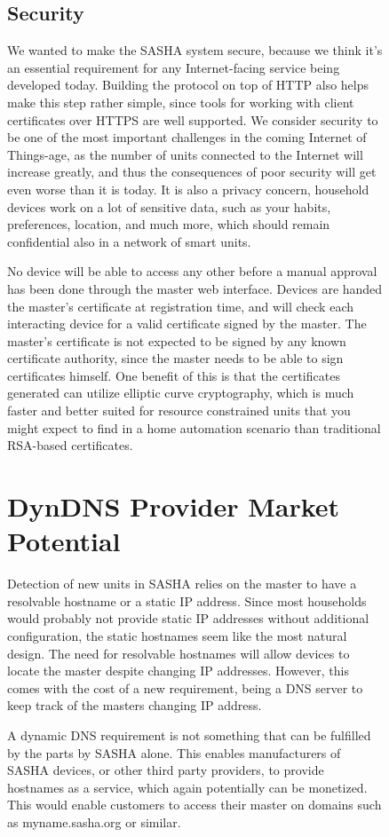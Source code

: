 \begin{figure}[H]
\subsection{Security}
We wanted to make the SASHA system secure, because we think it's an essential requirement for any Internet-facing service being developed today. Building the protocol on top of HTTP also helps make this step rather simple, since tools for working with client certificates over HTTPS are well supported. We consider security to be one of the most important challenges in the coming Internet of Things-age, as the number of units connected to the Internet will increase greatly, and thus the consequences of poor security will get even worse than it is today. It is also a privacy concern, household devices work on a lot of sensitive data, such as your habits, preferences, location, and much more, which should remain confidential also in a network of smart units.

No device will be able to access any other before a manual approval has been done through the master web interface. Devices are handed the master's certificate at registration time, and will check each interacting device for a valid certificate signed by the master. The master's certificate is not expected to be signed by any known certificate authority, since the master needs to be able to sign certificates himself. One benefit of this is that the certificates generated can utilize elliptic curve cryptography, which is much faster and better suited for resource constrained units that you might expect to find in a home automation scenario than traditional RSA-based certificates.

\section{DynDNS Provider Market Potential}
Detection of new units in SASHA relies on the master to have a resolvable hostname or a static IP address. Since most households would probably not provide static IP addresses without additional configuration, the static hostnames seem like the most natural design.
The need for resolvable hostnames will allow devices to locate the master despite changing IP addresses. However, this comes with the cost of a new requirement, being a DNS server to keep track of the masters changing IP address.

A dynamic DNS requirement is not something that can be fulfilled by the parts by SASHA alone. This enables manufacturers of SASHA devices, or other third party providers, to provide hostnames as a service, which again potentially can be monetized. This would enable customers to access their master on domains such as myname.sasha.org or similar.


\end{figure}
